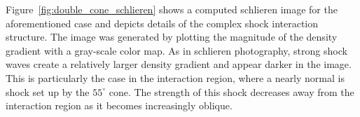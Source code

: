 


Figure~\ref{fig:double_cone_schlieren} shows a computed schlieren image for the aforementioned case and depicts details of the complex shock interaction structure.  The image was generated by plotting the magnitude of the density gradient with a gray-scale color map.  As in schlieren photography, strong shock waves create a relatively larger density gradient and appear darker in the image.  This is particularly the case in the interaction region, where a nearly normal is shock set up by the $55^\circ$ cone.  The strength of this shock decreases away from the interaction region as it becomes increasingly oblique.



